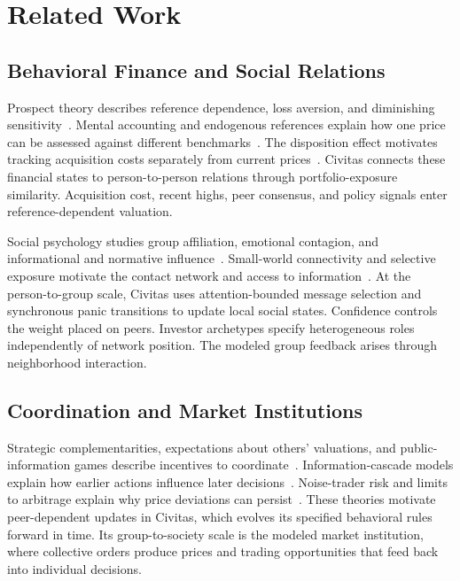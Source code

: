 \section{Related Work}
\label{sec:related}

\subsection{Behavioral Finance and Social Relations}

Prospect theory describes reference dependence, loss aversion, and diminishing sensitivity~\cite{kahneman1979prospect,tversky1992advances}. Mental accounting and endogenous references explain how one price can be assessed against different benchmarks~\cite{thaler1985mental,koszegi2006model}. The disposition effect motivates tracking acquisition costs separately from current prices~\cite{shefrin1985disposition,odean1998reluctant}. Civitas connects these financial states to person-to-person relations through portfolio-exposure similarity. Acquisition cost, recent highs, peer consensus, and policy signals enter reference-dependent valuation.

Social psychology studies group affiliation, emotional contagion, and informational and normative influence~\cite{tajfel1979integrative,hatfield1993emotional,deutsch1955study}. Small-world connectivity and selective exposure motivate the contact network and access to information~\cite{watts1998collective,sunstein2001republic}. At the person-to-group scale, Civitas uses attention-bounded message selection and synchronous panic transitions to update local social states. Confidence controls the weight placed on peers. Investor archetypes specify heterogeneous roles independently of network position. The modeled group feedback arises through neighborhood interaction.

\subsection{Coordination and Market Institutions}

Strategic complementarities, expectations about others' valuations, and public-information games describe incentives to coordinate~\cite{cooper1988coordinating,keynes1936general,morris2002social}. Information-cascade models explain how earlier actions influence later decisions~\cite{bikhchandani1992theory,banerjee1992simple}. Noise-trader risk and limits to arbitrage explain why price deviations can persist~\cite{delong1990noise,shleifer1997limits}. These theories motivate peer-dependent updates in Civitas, which evolves its specified behavioral rules forward in time. Its group-to-society scale is the modeled market institution, where collective orders produce prices and trading opportunities that feed back into individual decisions.

